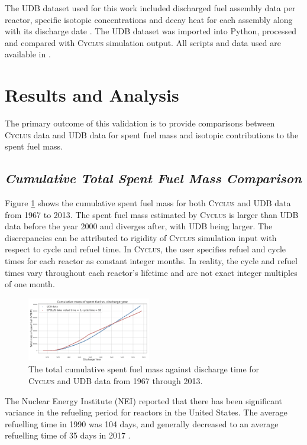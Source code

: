 \documentclass{anstrans}
\newcommand{\Cyclus}{\textsc{Cyclus}\xspace}%
\begin{document}
The UDB dataset used for this work included discharged fuel assembly data per reactor, specific isotopic concentrations and decay heat for each assembly along with its discharge date \cite{peterson_unf-st&dards_2017}. The UDB dataset was imported into Python, processed and compared with \Cyclus simulation output. All scripts and data used are available in \cite{chee_arfc/transition-scenarios_2018}. 
\section{Results and Analysis}
The primary outcome of this validation is to provide comparisons between \Cyclus data and UDB data for spent fuel mass and isotopic contributions to the spent fuel mass. 

\subsection{\textit{Cumulative Total Spent Fuel Mass Comparison}}
Figure \ref{fig:total_original} shows the cumulative spent fuel mass for both \Cyclus and UDB data from 1967 to 2013. The spent fuel mass estimated by \Cyclus is larger than UDB data before the year 2000 and diverges after, with UDB being larger. The discrepancies can be attributed to rigidity of \Cyclus simulation input with respect to cycle and refuel time. In \Cyclus, the user specifies refuel and cycle times for each reactor as constant integer months. In reality, the cycle and refuel times vary throughout each reactor's lifetime and are not exact integer multiples of one month. 

\begin{figure}[t] %
	\centering
	\includegraphics[width=0.48\textwidth]{figures/total_cumulative_mass_spent_fuel_original}
	\caption{The total cumulative spent fuel mass against discharge time for \Cyclus and UDB data from 1967 through 2013.}
	\label{fig:total_original}
\end{figure}

The Nuclear Energy Institute (NEI) reported that there has been significant variance in the refueling period for reactors in the United States. The average refuelling time in 1990 was 104 days, and generally decreased to an average refuelling time of 35 days in 2017 \cite{iaea_current_nodate}.
\end{document}
